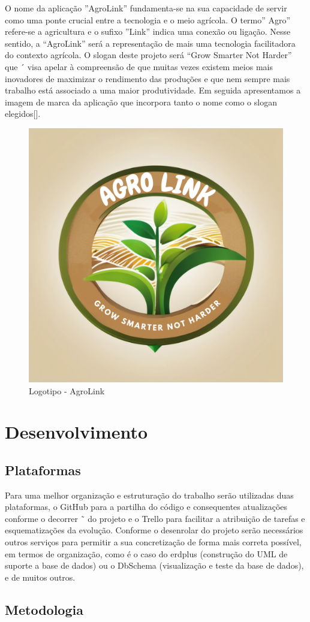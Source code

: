 \documentclass[conference]{IEEEtran}
\begin{document}
	O nome da aplicação ”AgroLink” fundamenta-se na sua capacidade de servir como uma ponte
	crucial entre a tecnologia e o meio agrícola. O termo” Agro” refere-se a agricultura e o sufixo
	”Link” indica uma conexão ou ligação. Nesse sentido, a “AgroLink” será a representação de
	mais uma tecnologia facilitadora do contexto agrícola. O slogan deste projeto será “Grow
	Smarter Not Harder” que ´ visa apelar à compreensão de que muitas vezes existem meios mais
	inovadores de maximizar o rendimento das produções e que nem sempre mais trabalho está
	associado a uma maior produtividade. Em seguida apresentamos a imagem de marca da
	aplicação que incorpora tanto o nome como o slogan elegidos[].
	
\begin{figure}[h]
	\centering
	\includegraphics[width=0.4\linewidth]{AGROLINK.png}
	\caption{Logotipo - AgroLink}
	\label{fig:agrolink}
\end{figure}

	
	\section{Desenvolvimento}
	\subsection{Plataformas}\label{AA}
	Para uma melhor organização e estruturação do trabalho serão utilizadas duas plataformas, o
	GitHub para a partilha do código e consequentes atualizações conforme o decorrer ˜ do
	projeto e o Trello para facilitar a atribuição de tarefas e esquematizações da evolução.
	Conforme o desenrolar do projeto serão necessários outros serviços para permitir a sua
	concretização de forma mais correta possível, em termos de organização, como é o caso do
	erdplus (construção do UML de suporte  a base de dados) ou  o DbSchema (visualização e
	teste da base de dados), e de muitos outros.
	
	
	\subsection{Metodologia}
	
\end{document}
